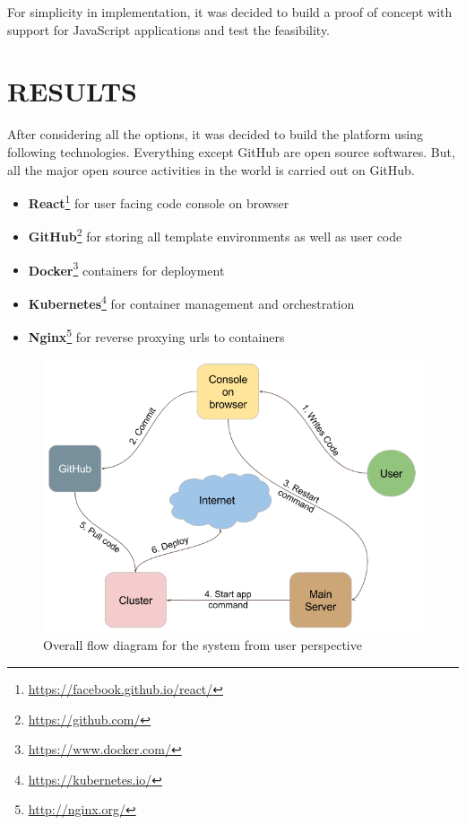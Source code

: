 \documentclass[DD]{iitmdiss}
\begin{document}
For simplicity in implementation, it was decided to build a proof of concept with support for JavaScript applications and test the feasibility. 
\chapter{RESULTS}


After considering all the options, it was decided to build the platform using following technologies. Everything except GitHub are open source softwares. But, all the major open source activities in the world is carried out on GitHub.
\begin{itemize}
	\item \textbf{React}\footnote{\url{https://facebook.github.io/react/}} for user facing code console on browser
	\item \textbf{GitHub}\footnote{\label{github_website}\url{https://github.com/}} for storing all template environments as well as user code
	\item \textbf{Docker}\footnote{\url{https://www.docker.com/}} containers for deployment
	\item \textbf{Kubernetes}\footnote{\url{https://kubernetes.io/}} for container management and orchestration
	\item \textbf{Nginx}\footnote{\url{http://nginx.org/}} for reverse proxying urls to containers
\end{itemize}

\begin{figure}
	\centering
	\includegraphics[width=0.9\linewidth]{img/user_flow}
	\caption[Overall flow diagram for the system]{Overall flow diagram for the system from user perspective}
	\label{fig:userflow}
\end{figure}
\end{document}
